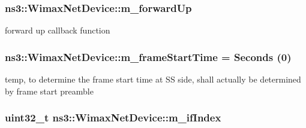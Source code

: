 \subsubsection[{\texorpdfstring{m\+\_\+forward\+Up}{m_forwardUp}}]{ ns3\+::\+Wimax\+Net\+Device\+::m\+\_\+forward\+Up\hspace{0.3cm}{\ttfamily [private]}}\hypertarget{classns3_1_1WimaxNetDevice_a03ea4a9669650b76bd7411e2c6811aea}{}\label{classns3_1_1WimaxNetDevice_a03ea4a9669650b76bd7411e2c6811aea}


forward up callback function 

\subsubsection[{\texorpdfstring{m\+\_\+frame\+Start\+Time}{m_frameStartTime}}]{ ns3\+::\+Wimax\+Net\+Device\+::m\+\_\+frame\+Start\+Time = {\bf Seconds} (0)\hspace{0.3cm}{\ttfamily [static]}}\hypertarget{classns3_1_1WimaxNetDevice_a63e934d6826d6343f1aadff35de1e294}{}\label{classns3_1_1WimaxNetDevice_a63e934d6826d6343f1aadff35de1e294}


temp, to determine the frame start time at SS side, shall actually be determined by frame start preamble 

\subsubsection[{\texorpdfstring{m\+\_\+if\+Index}{m_ifIndex}}]{\setlength{\rightskip}{0pt plus 5cm}uint32\+\_\+t ns3\+::\+Wimax\+Net\+Device\+::m\+\_\+if\+Index\hspace{0.3cm}{\ttfamily [private]}}\hypertarget{classns3_1_1WimaxNetDevice_a8483b79642afa7d64649afdde7d6314d}{}\label{classns3_1_1WimaxNetDevice_a8483b79642afa7d64649afdde7d6314d}


